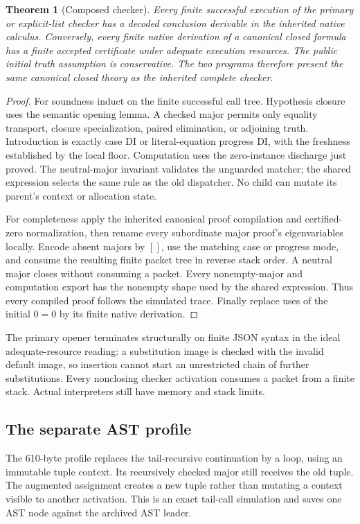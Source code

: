 \documentclass[11pt,letterpaper]{article}
\newtheorem{theorem}{Theorem}[section]
\theoremstyle{definition}\newtheorem{definition}[theorem]{Definition}
\theoremstyle{remark}\newtheorem{remark}[theorem]{Remark}
\begin{document}
\begin{theorem}[Composed checker]
Every finite successful execution of the primary or explicit-list checker
has a decoded conclusion derivable in the inherited native calculus.
Conversely, every finite native derivation of a canonical closed formula has
a finite accepted certificate under adequate execution resources. The public
initial truth assumption is conservative. The two programs therefore present
the same canonical closed theory as the inherited complete checker.
\end{theorem}
\begin{proof}
For soundness induct on the finite successful call tree. Hypothesis closure
uses the semantic opening lemma. A checked major permits only equality
transport, closure specialization, paired elimination, or adjoining truth.
Introduction is exactly case DI or literal-equation progress DI, with the
freshness established by the local floor. Computation uses the zero-instance
discharge just proved. The neutral-major invariant validates the unguarded
matcher; the shared expression selects the same rule as the old dispatcher.
No child can mutate its parent's context or allocation state.

For completeness apply the inherited canonical proof compilation and
certified-zero normalization, then rename every subordinate major proof's
eigenvariables locally. Encode absent majors by $[]$, use the matching case
or progress mode, and consume the resulting finite packet tree in reverse
stack order. A neutral major closes without consuming a packet. Every
nonempty-major and computation export has the nonempty shape used by the
shared expression. Thus every compiled proof follows the simulated trace.
Finally replace uses of the initial $0=0$ by its finite native derivation.
\end{proof}

The primary opener terminates structurally on finite JSON syntax in the
ideal adequate-resource reading: a substitution image is checked with the
invalid default image, so insertion cannot start an unrestricted chain of
further substitutions. Every nonclosing checker activation consumes a packet
from a finite stack. Actual interpreters still have memory and stack limits.

\subsection{The separate AST profile}

The 610-byte profile replaces the tail-recursive continuation by a loop,
using an immutable tuple context. Its recursively checked major still
receives the old tuple. The augmented assignment creates a new tuple rather
than mutating a context visible to another activation. This is an exact
tail-call simulation and saves one AST node against the archived AST leader.
\end{document}
